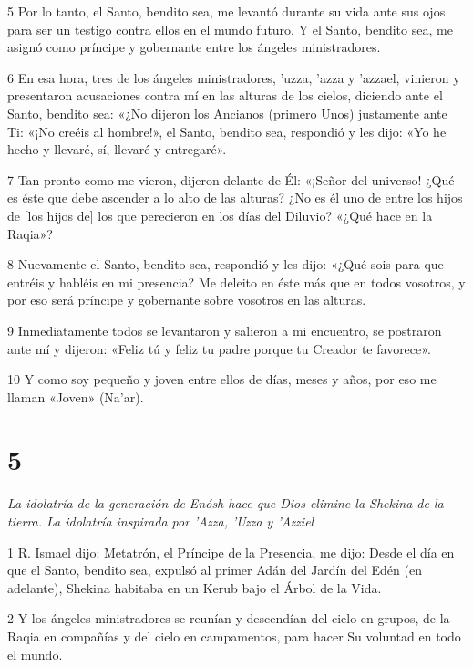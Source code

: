 \par 5 Por lo tanto, el Santo, bendito sea, me levantó durante su vida ante sus ojos para ser un testigo contra ellos en el mundo futuro. Y el Santo, bendito sea, me asignó como príncipe y gobernante entre los ángeles ministradores.

\par 6 En esa hora, tres de los ángeles ministradores, 'uzza, 'azza y 'azzael, vinieron y presentaron acusaciones contra mí en las alturas de los cielos, diciendo ante el Santo, bendito sea: «¿No dijeron los Ancianos (primero Unos) justamente ante Ti: «¡No creéis al hombre!», el Santo, bendito sea, respondió y les dijo: «Yo he hecho y llevaré, sí, llevaré y entregaré».

\par 7 Tan pronto como me vieron, dijeron delante de Él: «¡Señor del universo! ¿Qué es éste que debe ascender a lo alto de las alturas? ¿No es él uno de entre los hijos de [los hijos de] los que perecieron en los días del Diluvio? «¿Qué hace en la Raqia»?

\par 8 Nuevamente el Santo, bendito sea, respondió y les dijo: «¿Qué sois para que entréis y habléis en mi presencia? Me deleito en éste más que en todos vosotros, y por eso será príncipe y gobernante sobre vosotros en las alturas.

\par 9 Inmediatamente todos se levantaron y salieron a mi encuentro, se postraron ante mí y dijeron: «Feliz tú y feliz tu padre porque tu Creador te favorece».

\par 10 Y como soy pequeño y joven entre ellos de días, meses y años, por eso me llaman «Joven» (Na'ar).

\chapter{5}

\par \textit{La idolatría de la generación de Enósh hace que Dios elimine la Shekina de la tierra. La idolatría inspirada por 'Azza, 'Uzza y 'Azziel}

\par 1 R. Ismael dijo: Metatrón, el Príncipe de la Presencia, me dijo: Desde el día en que el Santo, bendito sea, expulsó al primer Adán del Jardín del Edén (en adelante), Shekina habitaba en un Kerub bajo el Árbol de la Vida.

\par 2 Y los ángeles ministradores se reunían y descendían del cielo en grupos, de la Raqia en compañías y del cielo en campamentos, para hacer Su voluntad en todo el mundo.

